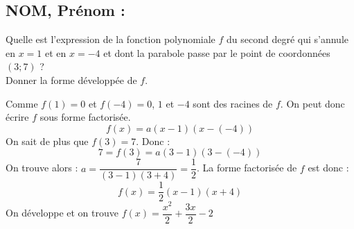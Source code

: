 \documentclass[a4paper,11pt,exos]{nsi} %
\begin{document}


\subsection*{NOM, Prénom : \dotfill} 

\maketitle

\begin{exercice}
    Quelle est l'expression de la fonction polynomiale $f$ du second degré qui s'annule en $x=1$ et en $x=-4$ et dont la parabole passe par le point de coordonnées $(3;7)$ ?\\
    Donner la forme développée de $f$.

    
\end{exercice}


Comme $f\left(1\right) = 0$ et $f\left(-4\right) = 0$, $1$ et $-4$ sont des racines de $f$. On peut donc écrire $f$ sous forme factorisée.\[f(x) = a(x-1)(x-(-4))\]On sait de plus que $f(3) = 7$. Donc : \[7 = f(3) = a(3-1)(3-(-4)) \]On trouve alors : $a = \dfrac{7}{(3-1)(3+4)} = \dfrac{1}{2}$. La forme factorisée de $f$ est donc :\[f(x) = \dfrac{1}{2}(x-1)(x+4)\]On développe et on trouve $f(x) = \dfrac{x^2}{2}+\dfrac{3x}{2}-2$
\end{document}
